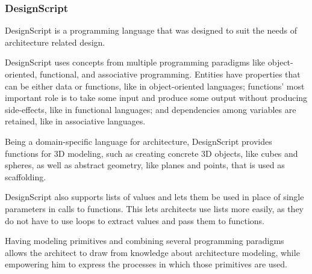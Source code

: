 \subsubsection{DesignScript}
\label{section:designscript:related}
DesignScript\cite{aish2012designscript} is a programming language that was designed to suit the needs of architecture related design.

DesignScript uses concepts from multiple programming paradigms like object-oriented, functional, and associative programming.
Entities have properties that can be either data or functions, like in object-oriented languages; functions' most important role is to take some input and produce some output without producing side-effects, like in functional languages; and dependencies among variables are retained, like in associative languages.


Being a domain-specific language for architecture, DesignScript provides functions for 3D modeling, such as creating concrete 3D objects, like cubes and spheres, as well as abstract geometry, like planes and points, that is used as scaffolding.

DesignScript also supports lists of values and lets them be used in place of single parameters in calls to functions.
This lets architects use lists more easily, as they do not have to use loops to extract values and pass them to functions.%

Having modeling primitives and combining several programming paradigms allows the architect to draw from knowledge about architecture modeling, while empowering him to express the processes in which those primitives are used.


